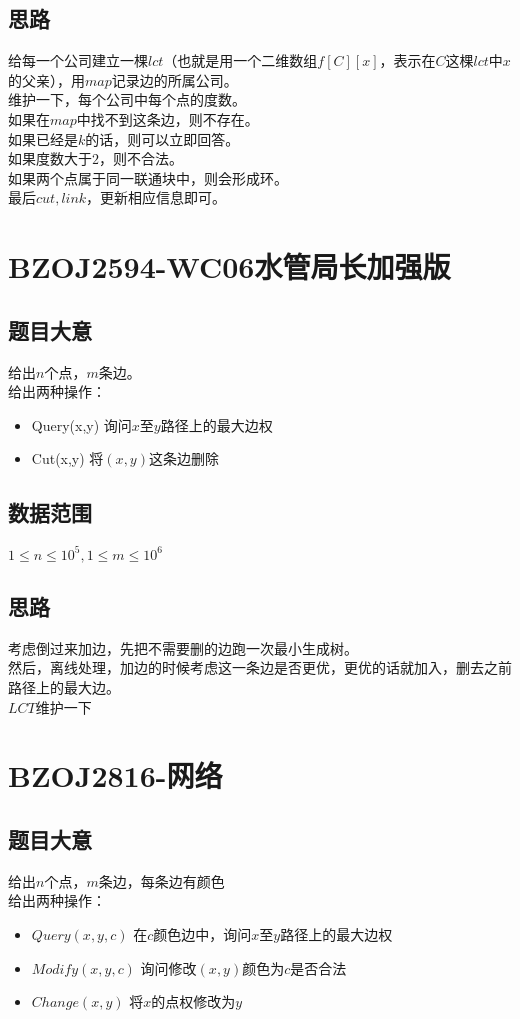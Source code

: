 \documentclass{ctexart}
\numberwithin{equation}{section}
\begin{document}
\begin{flushleft}
  \subsection{思路}
  给每一个公司建立一棵$lct$（也就是用一个二维数组$f[C][x]$，表示在$C$这棵$lct$中$x$的父亲），用$map$记录边的所属公司。\\
  维护一下，每个公司中每个点的度数。\\
  如果在$map$中找不到这条边，则不存在。\\
  如果已经是$k$的话，则可以立即回答。\\
  如果度数大于$2$，则不合法。\\
  如果两个点属于同一联通块中，则会形成环。\\
  最后$cut, link$，更新相应信息即可。\\
  \newpage
  
  \section{BZOJ2594-WC06水管局长加强版}
  \subsection{题目大意}
  给出$n$个点，$m$条边。\\
  给出两种操作：\\
  \begin{itemize}
  \item Query(x,y) 询问$x$至$y$路径上的最大边权
  \item Cut(x,y) 将$(x,y)$这条边删除
  \end{itemize}
  \subsection{数据范围}
  $1\le n\le 10^5, 1\le m \le 10^6$
  \subsection{思路}
  考虑倒过来加边，先把不需要删的边跑一次最小生成树。\\
  然后，离线处理，加边的时候考虑这一条边是否更优，更优的话就加入，删去之前路径上的最大边。\\
  $LCT$维护一下\\
  \newpage
  
  \section{BZOJ2816-网络}
  \subsection{题目大意}
  给出$n$个点，$m$条边，每条边有颜色\\
  给出两种操作：\\
  \begin{itemize}
  \item $Query(x,y,c)$ 在$c$颜色边中，询问$x$至$y$路径上的最大边权
  \item $Modify(x,y,c)$ 询问修改$(x,y)$颜色为$c$是否合法
  \item $Change(x,y)$ 将$x$的点权修改为$y$
  \end{itemize}

\end{flushleft}
\end{document}
